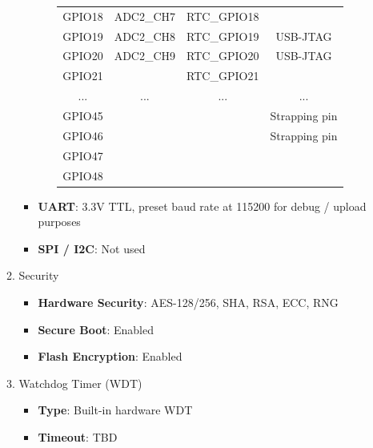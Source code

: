 \documentclass[conference]{IEEEtran}
\begin{document}
\begin{enumerate}[label=\arabic*.]
\begin{enumerate}[label=\alph*.]
\begin{itemize}
\begin{enumerate}[label=\roman*.]
\begin{table}[ht]
\begin{tabular}{|c|c|c|c|}
GPIO18 & ADC2\_CH7 & RTC\_GPIO18 &  \\
GPIO19 & ADC2\_CH8 & RTC\_GPIO19 & USB-JTAG \\
GPIO20 & ADC2\_CH9 & RTC\_GPIO20 & USB-JTAG \\
GPIO21 &  & RTC\_GPIO21 &  \\
... & ... & ... & ... \\
GPIO45 &  &  & Strapping pin \\
GPIO46 &  &  & Strapping pin \\
GPIO47 &  &  &  \\
GPIO48 &  &  &  \\
\hline
\end{tabular}
\end{table}
\end{enumerate}

\item \textbf{UART}: 3.3V TTL, preset baud rate at 115200 for debug / upload purposes \\
\item \textbf{SPI / I2C}: Not used\\
\end{itemize}

\item Security\\
\begin{itemize}
\item \textbf{Hardware Security}: AES-128/256, SHA, RSA, ECC, RNG\\
\item \textbf{Secure Boot}: Enabled\\
\item \textbf{Flash Encryption}: Enabled\\
\end{itemize}

\item Watchdog Timer (WDT)\\
\begin{itemize}
\item \textbf{Type}: Built-in hardware WDT\\
\item \textbf{Timeout}: TBD\\
\end{itemize}


\end{enumerate}
\end{enumerate}
\end{document}
